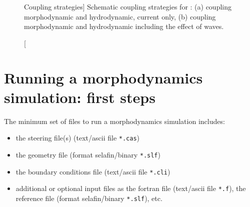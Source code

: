 \begin{figure}[H]%
\begin{center}
%
\hfil
%
%
\hfil
%
%
\hfil
\mbox{}
\end{center}
\caption
[Coupling strategies]
{Schematic coupling strategies for \sisyphe: (a) coupling morphodynamic and hydrodynamic, current only, (b) coupling morphodynamic and hydrodynamic including the effect of waves.}
\label{fig:CouplingStrategies}
\end{figure}

\pagebreak

\section{Running a morphodynamics simulation: first steps}
The minimum set of files to run a morphodynamics simulation includes:
\begin{itemize}
\item the steering file(s) (text/ascii file \texttt{*.cas})
\item the geometry file (format selafin/binary \texttt{*.slf})
\item the boundary conditions file (text/ascii file \texttt{*.cli})
\item additional or optional input files as the fortran file (text/ascii file \texttt{*.f}), the reference file (format selafin/binary \texttt{*.slf}), etc.
\end{itemize}

